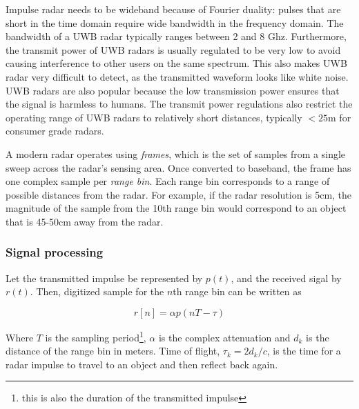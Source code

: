 \documentclass[12pt]{article}
\begin{document}
Impulse radar needs to be wideband because of Fourier duality:
pulses that are short in the time domain require wide bandwidth in the
frequency domain. The bandwidth of a UWB radar typically ranges
between 2 and 8 Ghz. Furthermore, the transmit power of UWB radars is
usually regulated to be very low to avoid causing interference to
other users on the same spectrum. This also makes UWB radar very
difficult to detect, as the transmitted waveform looks like white
noise. UWB radars are also popular because the low transmission power
ensures that the signal is harmless to humans. The transmit power
regulations also restrict the operating range of UWB radars to
relatively short distances, typically $<25$m for consumer grade
radars.



A modern radar operates using \emph{frames}, which is the set of
samples from a single sweep across the radar's sensing area. Once
converted to baseband, the frame has one complex sample per
\emph{range bin}. Each range bin corresponds to a range of possible
distances from the radar. For example, if the radar resolution is 5cm,
the magnitude of the sample from the 10th range bin would correspond
to an object that is 45-50cm away from the radar.

\subsubsection*{Signal processing}

Let the transmitted impulse be represented by $p(t)$, and the received
sigal by $r(t)$. Then, digitized sample for the $n$th range bin can be
written as

\begin{equation}
r[n] = \alpha p(nT - \tau)  
\end{equation}

Where $T$ is the sampling period\footnote{this is also the duration of
  the transmitted impulse}, $\alpha$ is the complex attenuation and
$d_k$ is the distance of the range bin in meters. Time of flight,
$\tau_k = 2d_k/c$, is the time for a radar impulse to travel to an object and
then reflect back again. 
\end{document}
